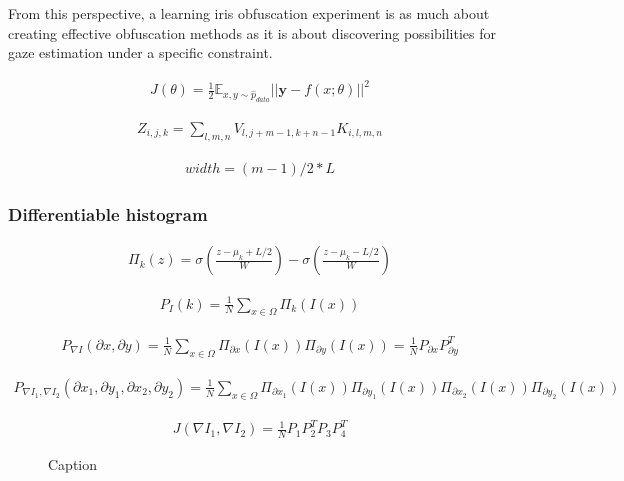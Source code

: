 From this perspective, a learning iris obfuscation experiment is as much about creating effective obfuscation methods as it is about discovering possibilities for gaze estimation under a specific constraint.

\begin{align}
    J(\theta) = \frac{1}{2}\mathbb{E}_{x,y\sim \hat{p}_{data}} ||\mathbf{y}-f(x;\theta)||^2
\end{align}

\begin{align}
    Z_{i,j,k} = \sum_{l,m,n} V_{l,j+m-1, k+n-1}K_{i,l,m,n}
\end{align}

\begin{align}
    width = (m-1)/2*L
\end{align}

\subsubsection{Differentiable histogram}

\begin{align}
    \Pi_k(z) = \sigma(\frac{z-\mu_k+L/2}{W}) - \sigma(\frac{z-\mu_k-L/2}{W})
\end{align}

\begin{align}
    P_I(k) = \frac{1}{N}\sum_{x\in\Omega}\Pi_k(I(x))
\end{align}

\begin{align}
    P_{\nabla I}(\partial x, \partial y) = \frac{1}{N}\sum_{x\in\Omega}\Pi_{\partial x}(I(x))\Pi_{\partial y}(I(x)) = \frac{1}{N}P_{\partial x}P_{\partial y}^T
\end{align}

\begin{align}
    P_{\nabla I_1, \nabla I_2}(\partial x_1, \partial y_1, \partial x_2, \partial y_2) = \frac{1}{N}\sum_{x\in\Omega}\Pi_{\partial x_1}(I(x))\Pi_{\partial y_1}(I(x))\Pi_{\partial x_2}(I(x))\Pi_{\partial y_2}(I(x))
\end{align}

\begin{align}
    J(\nabla I_1, \nabla I_2) = \frac{1}{N}P_1P_2^TP_3P_4^T
\end{align}

\begin{figure}
    \centering
    \caption{Caption}
    \label{fig:my_label}
\end{figure}